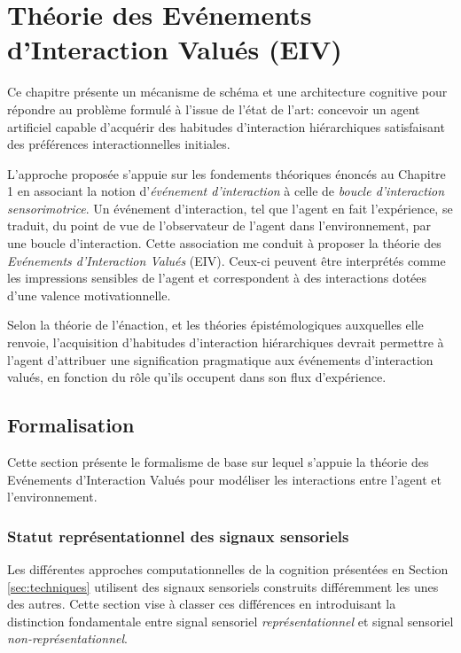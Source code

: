 \chapter{Théorie des Evénements d'Interaction Valués (EIV)}

\noindent
Ce chapitre présente un mécanisme de schéma et une architecture cognitive pour répondre au problème formulé à l'issue de l'état de l'art: 
concevoir un agent artificiel capable d'acquérir des habitudes d'interaction hiérarchiques satisfaisant des préférences interactionnelles initiales.

L'approche proposée s'appuie sur les fondements théoriques énoncés au Chapitre 1 en associant la notion d'\emph{événement d'interaction} à celle de \emph{boucle d'interaction sensorimotrice}. 
Un événement d'interaction, tel que l'agent en fait l'expérience, se traduit, du point de vue de l'observateur de l'agent dans l'environnement, par une boucle d'interaction. 
Cette association me conduit à proposer la théorie des \emph{Evénements d'Interaction Valués} (EIV).
Ceux-ci peuvent être interprétés comme les impressions sensibles de l'agent et correspondent à des interactions dotées d'une valence motivationnelle.

Selon la théorie de l'énaction, et les théories épistémologiques auxquelles elle renvoie, l'acquisition d'habitudes d'interaction hiérarchiques devrait permettre à l'agent d'attribuer une signification pragmatique aux événements d'interaction valués, en fonction du rôle qu'ils occupent dans son flux d'expérience.  






\section{Formalisation}

\noindent
Cette section présente le formalisme de base sur lequel s'appuie la théorie des Evénements d'Interaction Valués pour modéliser les interactions entre l'agent et l'environnement.

\subsection{Statut représentationnel des signaux sensoriels}
\label{sec:representationnel}

\noindent
Les différentes approches computationnelles de la cognition présentées en Section \ref{sec:techniques} utilisent des signaux sensoriels construits différemment les unes des autres.
Cette section vise à classer ces différences en introduisant la distinction fondamentale entre signal sensoriel \emph{représentationnel} et signal sensoriel \emph{non-représentationnel}. 


